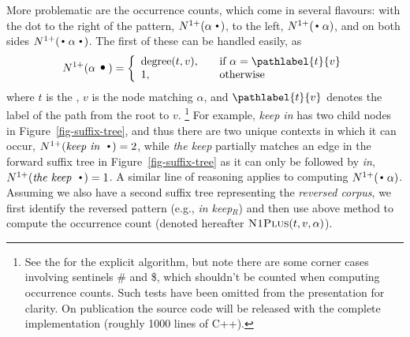 More problematic are the occurrence counts, which come in several
flavours: with the dot to the right of the pattern, $\nlplus{\patdot}$,
to the left,  $\nlplus{\dotpat}$, and on both sides
$\nlplus{\dotpatdot}$. 
The first of these can be handled easily, as 
\begin{equation*}
\nlplus{\patdot} = \left\{ 
\begin{array}{ll}
   \degree{t}{v}, \quad & \text{if~} \alpha = \pathlabel{t}{v} \\
   1, & \text{otherwise}
\end{array} \right.
\end{equation*}
where $t$ is the \CST, $v$ is the node matching $\alpha$, and 
$\pathlabel{t}{v}$ denotes the label of the path from the root to $v$.%
\footnote{See the \supp for the explicit algorithm, but note there are some corner cases involving sentinels \#
  and \$, which shouldn't be counted when computing occurrence counts.
  Such tests have been omitted from the presentation for clarity. On publication the
  source code will be released with the complete implementation (roughly 1000 lines of C++).}
For example, \emph{keep in} has two child nodes in  Figure~\ref{fig-suffix-tree},
and thus there are two unique contexts in which it can occur, $\nlplus{\emph{keep in~}\Bigcdot}=2$,
while \emph{the keep} partially matches an edge in the forward suffix tree in
Figure~\ref{fig-suffix-tree} as it can only be followed by \emph{in}, $\nlplus{\emph{the keep~}\Bigcdot}=1$.
A similar line of reasoning applies to computing $\nlplus{\dotpat}$. 
Assuming we also have a second suffix tree representing the \emph{reversed corpus}, we first identify the reversed pattern (e.g., \emph{in keep}$_R$) and then use above method to compute the occurrence count (denoted hereafter $\textsc{N1Plus}(t, v, \alpha)$). 

